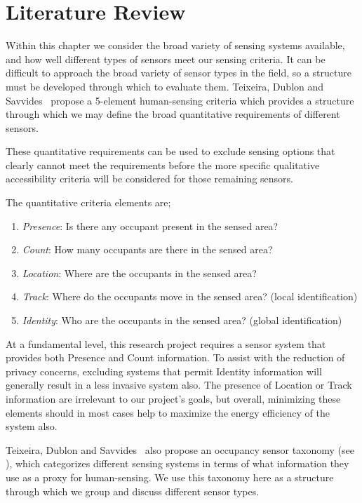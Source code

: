 \documentclass[../thesis/thesis.tex]{subfiles}
\begin{document}
\chapter{Literature Review}
\label{chap:litreview}

Within this chapter we consider the broad variety of sensing systems available, and how well different types of sensors meet our sensing criteria. It can be difficult to approach the broad variety of sensor types in the field, so a structure must be developed through which to evaluate them. Teixeira, Dublon and Savvides~\cite{teixeira2010survey} propose a 5-element human-sensing criteria which provides a structure through which we may define the broad quantitative requirements of different sensors.

These quantitative requirements can be used to exclude sensing options that clearly cannot meet the requirements before the more specific qualitative accessibility criteria will be considered for those remaining sensors. 

The quantitative criteria elements are;
\begin{enumerate}
 \item \emph{Presence}: Is there any occupant present in the sensed area?
 \item \emph{Count}: How many occupants are there in the sensed area?
 \item \emph{Location}: Where are the occupants in the sensed area?
 \item \emph{Track}: Where do the occupants move in the sensed area? (local identification)
 \item \emph{Identity}: Who are the occupants in the sensed area? (global identification)
\end{enumerate}

At a fundamental level, this research project requires a sensor system that provides both Presence and Count information. To assist with the reduction of privacy concerns, excluding systems that permit Identity information will generally result in a less invasive system also. The presence of Location or Track information are irrelevant to our project's goals, but overall, minimizing these elements should in most cases help to maximize the energy efficiency of the system also.

Teixeira, Dublon and Savvides~\cite{teixeira2010survey} also propose an occupancy sensor taxonomy (see ), which categorizes different sensing systems in terms of what information they use as a proxy for human-sensing. We use this taxonomy here as a structure through which we group and discuss different sensor types.
\end{document}
